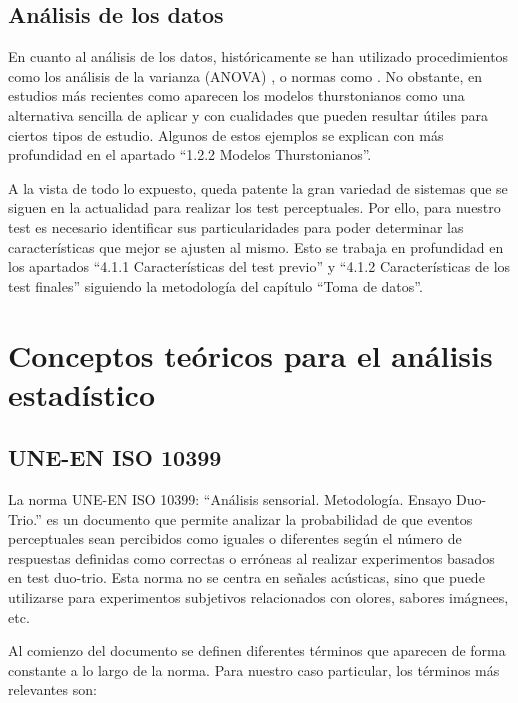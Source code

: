 \documentclass[11pt,a4paper]{book}
\begin{document}
	    \subsection{Análisis de los datos}
    		En cuanto al análisis de los datos, históricamente se han utilizado procedimientos como los análisis de la varianza (ANOVA) \cite{2011VEmiya, 2016BPostma, 2019LKritly, 2019GPulvirenti, 2019MShiell, 2019VHongisto}, o normas como \cite{ISO10399}. No obstante, en estudios más recientes como \cite{delaPrida2019, delaPrida2021} aparecen los modelos thurstonianos como una alternativa sencilla de aplicar y con cualidades que pueden resultar útiles para ciertos tipos de estudio. Algunos de estos ejemplos se explican con más profundidad en el apartado ``1.2.2 Modelos Thurstonianos''.\newline
    
    A la vista de todo lo expuesto, queda patente la gran variedad de sistemas que se siguen en la actualidad para realizar los test perceptuales. Por ello, para nuestro test es necesario identificar sus particularidades para poder determinar las características que mejor se ajusten al mismo. Esto se trabaja en profundidad en los apartados ``4.1.1 Características del test previo'' y ``4.1.2 Características de los test finales'' siguiendo la metodología del capítulo ``Toma de datos''.
    
    \section{Conceptos teóricos para el análisis estadístico}    
        \subsection{UNE-EN ISO 10399}
            La norma UNE-EN ISO 10399: ``Análisis sensorial. Metodología. Ensayo Duo-Trio.''\cite{ISO10399} es un documento que permite analizar la probabilidad de que eventos perceptuales sean percibidos como iguales o diferentes según el número de respuestas definidas como correctas o erróneas al realizar experimentos basados en test duo-trio. Esta norma no se centra en señales acústicas, sino que puede utilizarse para experimentos subjetivos relacionados con olores, sabores imágnees, etc.
            
        
            Al comienzo del documento se definen diferentes términos que aparecen de forma constante a lo largo de la norma. Para nuestro caso particular, los términos más relevantes son:
        
\end{document}
